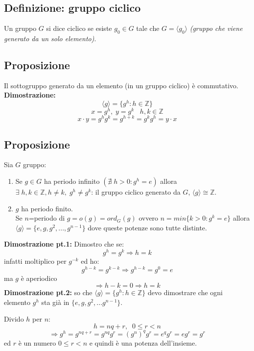 \subsection{Definizione: gruppo ciclico}
Un gruppo \(G\) si dice ciclico se esiste \(g_0\in G\) tale che \(G=\langle g_0\rangle\) \textit{(gruppo che viene generato da un solo elemento)}.

\subsection{Proposizione}
Il sottogruppo generato da un elemento (in un gruppo ciclico) è commutativo.
\\
\textbf{Dimostrazione:}
\[\langle g\rangle =\{g^h:h\in\mathbb{Z}\}\]
\[x=g^h,\;y=g^k\;\;\;h,k\in\mathbb{Z}\]
\[x\cdot y=g^hg^k=g^{h+k}=g^kg^h=y\cdot x\]

\subsection{Proposizione}
Sia \(G\) gruppo:
\begin{enumerate}

	\item Se \(g\in G\) ha periodo infinito \((\nexists \;h>0:g^h=e)\) allora \(\exists\; h,k\in\mathbb{Z}, h\neq k,\;g^h\neq g^k\): il gruppo ciclico generato da \(G\), \(\langle g\rangle \cong\mathbb{Z}\).

	\item \(g\) ha periodo finito.
	\\Se \(n\)=periodo di \(g=o(g)=ord_G(g)\) %
	ovvero \(n=min\{k>0: g^k=e\}\) allora \(\langle g\rangle=\{e,g,g^2,...,g^{n-1}\}\) dove queste potenze sono tutte distinte.

\end{enumerate}
\textbf{Dimostrazione pt.1:} Dimostro che se:
\[g^h=g^k\Rightarrow h=k\]
infatti moltiplico per \(g^{-k}\) ed ho:
\[g^{h-k}=g^{k-k}\Rightarrow g^{h-k}=g^0=e\]
ma \(g\) è aperiodico 
\[\Rightarrow h-k=0\Rightarrow h=k\]
\textbf{Dimostrazione pt.2:} so che \(\langle g\rangle =\{g^h:h\in\mathbb{Z}\}\) devo dimostrare che ogni elemento \(g^h\) sta già in \(\{e,g,g^2,...g^{n-1}\}\).

Divido \(h\) per \(n\):
\[h=nq+r,\;\;0\leq r<n\]
\[\Rightarrow g^h=g^{nq+r}=g^{nq}g^r=(g^n)^qg^r=e^qg^r=eg^r=g^r\]
ed \(r\) è un numero \(0\leq r<n\) e quindi è una potenza dell'insieme.


